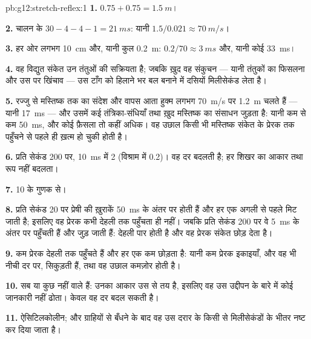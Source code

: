 \begin{solution}{pb:g12:stretch-reflex:1}
\textbf{1.} $0.75 + 0.75 = \qty{1.5}{m}$।

\textbf{2.} चालन के $30 - 4 - 4 - 1 = \qty{21}{ms}$: यानी $1.5/0.021
\approx \qty{70}{m/s}$।

\textbf{3.} हर ओर लगभग \qty{10}{cm} और, यानी कुल \qty{0.2}{m}:
$0.2/70 \approx \qty{3}{ms}$ और, यानी कोई \qty{33}{ms}।

\textbf{4.} वह विद्युत संकेत उन तंतुओं की सक्रियता है; जबकि ख़ुद वह संकुचन
--- यानी तंतुकों का फिसलना और उस  पर खिंचाव --- उस टाँग को हिलाने भर
बल बनाने में दसियों मिलीसेकंड लेता है।

\textbf{5.} रज्जु से मस्तिष्क तक का संदेश और वापस आता हुक्म लगभग
\qty{70}{m/s} पर \qty{1.2}{m} चलते हैं --- यानी \qty{17}{ms} --- और उसमें
कई तंत्रिका-संधियाँ तथा ख़ुद मस्तिष्क का संसाधन जुड़ता है: यानी कम से कम
\qty{50}{ms}, और कोई फ़ैसला तो कहीं अधिक। वह उछाल किसी भी मस्तिष्क संकेत के
प्रेरक  तक पहुँचने से पहले ही ख़त्म हो चुकी होती है।

\textbf{6.} प्रति सेकंड 200 पर, \qty{10}{ms} में 2 
(विश्राम में 0.2)। वह दर बदलती है; हर शिखर का आकार तथा रूप नहीं बदलता।

\textbf{7.} 10 के गुणक से।

\textbf{8.} प्रति सेकंड 20 पर प्रेषी की ख़ुराकें \qty{50}{ms} के अंतर पर
होती हैं और हर एक अगली से पहले मिट जाती है; इसलिए वह प्रेरक  कभी
देहली तक पहुँचता ही नहीं। जबकि प्रति सेकंड 200 पर वे \qty{5}{ms} के अंतर पर
पहुँचती हैं और जुड़ जाती हैं: देहली पार होती है और वह प्रेरक  संकेत
छोड़ देता है।

\textbf{9.} कम प्रेरक  देहली तक पहुँचते हैं और हर एक कम 
छोड़ता है: यानी कम प्रेरक इकाइयाँ, और वह भी नीची दर पर, सिकुड़ती हैं, तथा वह
उछाल कमज़ोर होती है।

\textbf{10.}  सब या कुछ नहीं वाले हैं: उनका आकार उस  से तय
है, इसलिए वह उस उद्दीपन के बारे में कोई जानकारी नहीं ढोता। केवल वह दर बदल
सकती है।

\textbf{11.} ऐसिटिलकोलीन; और ग्राहियों से बँधने के बाद वह उस दरार के किसी
 से मिलीसेकंडों के भीतर नष्ट कर दिया जाता है।


\end{solution}
